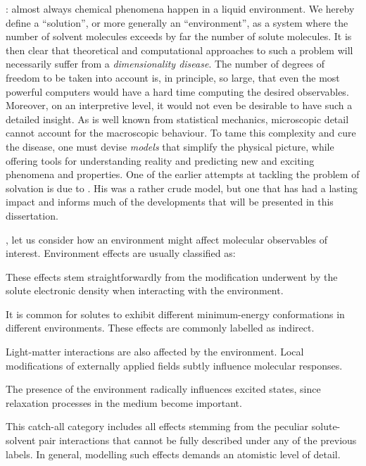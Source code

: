 : almost always
chemical phenomena happen in a liquid environment.\autocite{Reichardt2010-le}
We hereby define a \enquote{solution}, or more generally an
\enquote{environment}, as
a system where the number of solvent molecules exceeds by far the number
of solute molecules.\autocite{Tomasi2004-dc, Tomasi2007-es}
It is then clear that theoretical and computational approaches to such a
problem will necessarily suffer from a \emph{dimensionality disease}.
The number of degrees of freedom to be taken into account is, in
principle, so large, that even the most powerful computers
would have a hard time computing the desired observables.
Moreover, on an interpretive level, it would not even be desirable to
have such a detailed insight.
As is well known from statistical mechanics, microscopic detail cannot
account for the macroscopic behaviour.\autocite{Hill1960-ql,
Hansen2013-io}
To tame this complexity and cure the disease, one must devise
\emph{models} that simplify the physical picture, while offering tools for
understanding reality and predicting new and exciting
phenomena and properties.\autocite{Anderson1972-ai, Winsberg2010-sy, Kovac2011-ew}
One of the earlier attempts at tackling the problem of solvation is due
to \citeauthor{Onsager1936-wf}. His was a rather crude model, but one
that has had a lasting impact and informs much of the developments that
will be presented in this dissertation.\autocite{Onsager1936-wf}

, let us consider how an
environment might affect molecular observables of interest.
Environment effects are usually classified as:
\begin{description}[leftmargin=2mm, font=\itshape]
\item[Direct.]
  These effects stem straightforwardly from the modification underwent by
  the solute electronic density when interacting with the environment.
\item[Indirect.]
  It is common for solutes to exhibit different minimum-energy
  conformations in different environments. These effects are commonly
  labelled as indirect.
\item[Local field.]
  Light-matter interactions are also affected by the environment. Local
  modifications of externally applied fields subtly influence molecular
  responses.\autocite{Cammi1998-jp, Pipolo2014-sd}
\item[Dynamic.]
  The presence of the environment radically influences excited states,
  since relaxation processes in the medium become
  important.\autocite{Aguilar1993-pu, Cammi1995-ah}
\item[Specific.] This catch-all category includes all effects
  stemming from the peculiar solute-solvent pair interactions that
  cannot be fully described under any of the previous labels.
  In general, modelling such effects demands an atomistic level of
  detail.
\end{description}

